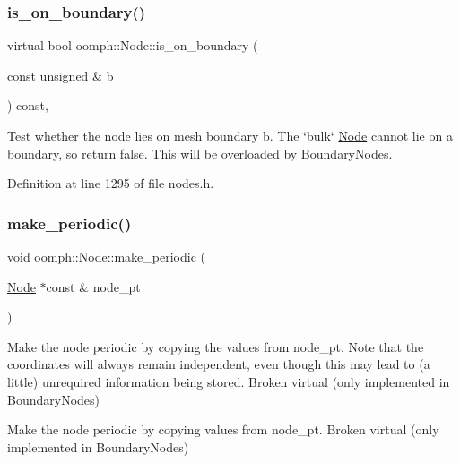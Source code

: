 \subsubsection{\texorpdfstring{is\+\_\+on\+\_\+boundary()}{is\_on\_boundary()}\hspace{0.1cm}{\footnotesize\ttfamily [2/2]}}
{\footnotesize\ttfamily virtual bool oomph\+::\+Node\+::is\+\_\+on\+\_\+boundary (\begin{DoxyParamCaption}\item[{const unsigned \&}]{b }\end{DoxyParamCaption}) const\hspace{0.3cm}{\ttfamily [inline]}, {\ttfamily [virtual]}}



Test whether the node lies on mesh boundary b. The \char`\"{}bulk\char`\"{} \hyperlink{classoomph_1_1Node}{Node} cannot lie on a boundary, so return false. This will be overloaded by Boundary\+Nodes. 



Definition at line 1295 of file nodes.\+h.

\mbox{\label{classoomph_1_1Node_aeb07848c19b83fd8b9690b8fcc200d56}} 
\subsubsection{\texorpdfstring{make\+\_\+periodic()}{make\_periodic()}}
{\footnotesize\ttfamily void oomph\+::\+Node\+::make\+\_\+periodic (\begin{DoxyParamCaption}\item[{\hyperlink{classoomph_1_1Node}{Node} $\ast$const \&}]{node\+\_\+pt }\end{DoxyParamCaption})\hspace{0.3cm}{\ttfamily [virtual]}}



Make the node periodic by copying the values from node\+\_\+pt. Note that the coordinates will always remain independent, even though this may lead to (a little) unrequired information being stored. Broken virtual (only implemented in Boundary\+Nodes) 

Make the node periodic by copying values from node\+\_\+pt. Broken virtual (only implemented in Boundary\+Nodes) 

